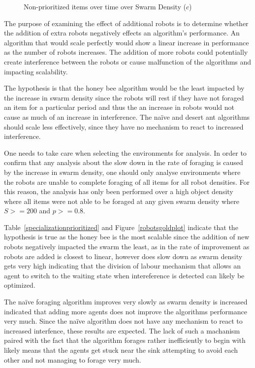 \begin{figure}[!htb]
\centering
\resizebox{\textwidth}{!}{}
\caption{Non-prioritized items over time over Swarm Density ($c$)}
\label{robotswasteplot}
\end{figure}

The purpose of examining the effect of additional robots is to determine whether the addition of extra robots negatively effects an algorithm's performance. An algorithm that would scale perfectly would show a linear increase in performance as the number of robots increases. The addition of more robots could potentially create interference between the robots or cause malfunction of the algorithms and impacting scalability. 

The hypothesis is that the honey bee algorithm would be the least impacted by the increase in swarm density since the robots will rest if they have not foraged an item for a particular period and thus the an increase in robots would not cause as much of an increase in interference. The na\"ive and desert ant algorithms should scale less effectively, since they have no mechanism to react to increased interference.

One needs to take care when selecting the environments for analysis. In order to confirm that any analysis about the slow down in the rate of foraging is caused by the increase in swarm density, one should only analyse environments where the robots are unable to complete foraging of all items for all robot densities. For this reason, the analysis has only been performed over a high object density where all items were not able to be foraged at any given swarm density where $S >= 200$ and $p >= 0.8$.

Table~\ref{specializationprioritized} and Figure~\ref{robotsgoldplot} indicate that the hypothesis is true as the honey bee is the most scalable since the addition of new robots negatively impacted the swarm the least, as in the rate of improvement as robots are added is closest to linear, however does slow down as swarm density gets very high indicating that the division of labour mechanism that allows an agent to switch to the waiting state when intereference is detected can likely be optimized. 

The na\"ive foraging algorithm improves very slowly as swarm density is increased indicated that adding more agents does not improve the algorithms performance very much. Since the na\"ive algorithm does not have any mechanism to react to increased interfence, these results are expected. The lack of such a machanism paired with the fact that the algorithm forages rather inefficiently to begin with likely means that the agents get stuck near the sink attempting to avoid each other and not managing to forage very much.

